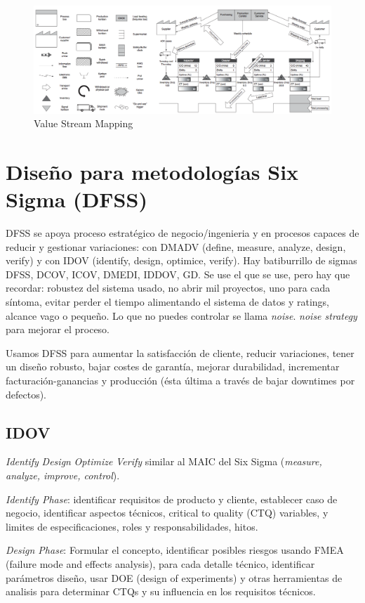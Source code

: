 \documentclass[]{article}
\begin{document}
\begin{figure}[ht!]
	\centering
	\includegraphics[width=170mm]{imagenes/ValueStreamMapping.png}
	\caption{Value Stream Mapping}
	\label{fig:ValueStreamMapping}
\end{figure}

\section{Diseño para metodologías Six Sigma (DFSS)}

DFSS se apoya proceso estratégico de negocio/ingenieria y en procesos capaces de reducir y gestionar variaciones: con DMADV (define, measure, analyze, design, verify) y con IDOV (identify, design, optimice, verify). Hay batiburrillo de sigmas DFSS, DCOV, ICOV, DMEDI, IDDOV, GD. Se use el que se use, pero hay que recordar: robustez del sistema usado, no abrir mil proyectos, uno para cada síntoma, evitar perder el tiempo alimentando el sistema de datos y ratings, alcance vago o pequeño. Lo que no puedes controlar se llama \textit{noise}. \textit{noise strategy} para mejorar el proceso.

Usamos DFSS para aumentar la satisfacción de cliente, reducir variaciones, tener un diseño robusto, bajar costes de garantía, mejorar durabilidad, incrementar facturación-ganancias y producción (ésta última a través de bajar downtimes por defectos).

\subsection{IDOV} \textit{Identify} \textit{Design} \textit{Optimize} \textit{Verify} similar al MAIC del Six Sigma (\textit{measure, analyze, improve, control}).

\textit{Identify Phase}: identificar requisitos de producto y cliente, establecer caso de negocio, identificar aspectos técnicos, critical to quality (CTQ) variables, y limites de especificaciones, roles y responsabilidades, hitos.

\textit{Design Phase}: Formular el concepto, identificar posibles riesgos usando FMEA (failure mode and effects analysis), para cada detalle técnico, identificar parámetros diseño, usar DOE (design of experiments) y otras herramientas de analisis para determinar CTQs y su influencia en los requisitos técnicos.
\end{document}
